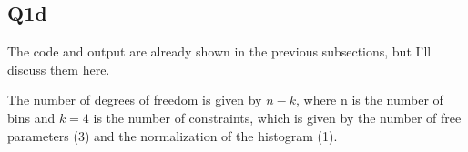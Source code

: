 \subsection{Q1d}

The code and output are already shown in the previous subsections, but I'll discuss them here.

The number of degrees of freedom is given by $n - k$, where n is the number of bins and $k = 4$ is the number of constraints, which is given by the
number of free parameters (3) and the normalization of the histogram (1).

